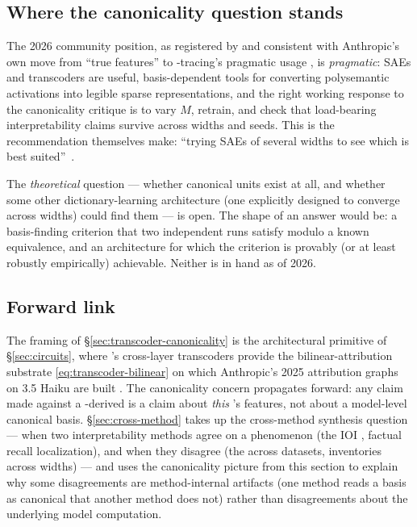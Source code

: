 \subsection{Where the canonicality question stands}
\label{sec:canonicality-frontier}

The 2026 community position, as registered by
\citet[\S 1]{leask2025-sae-not-canonical} and consistent with
Anthropic's own move from ``true features''
to -tracing's pragmatic  usage
, is
\emph{pragmatic}: SAEs and transcoders are useful, basis-dependent
tools for converting polysemantic activations into legible sparse
representations, and the right working response to the canonicality
critique is to vary $M$, retrain, and check that load-bearing
interpretability claims survive across widths and seeds. This is the
recommendation \citeauthor{leask2025-sae-not-canonical} themselves
make: ``trying SAEs of several widths to see which is best
suited''~\citep[\S 1]{leask2025-sae-not-canonical}.

The \emph{theoretical} question --- whether canonical units exist at
all, and whether some other dictionary-learning architecture (one
explicitly designed to converge across widths) could find them ---
is open. The shape of an answer would be: a basis-finding criterion
that two independent runs satisfy modulo a known equivalence, and an
architecture for which the criterion is provably (or at least
robustly empirically) achievable. Neither is in hand as of 2026.

\subsection{Forward link}
\label{sec:canonicality-forward}

The  framing of \S\ref{sec:transcoder-canonicality} is the
architectural primitive of \S\ref{sec:circuits}, where
\citet{lindsey2025-circuit-tracing}'s cross-layer transcoders provide
the bilinear-attribution substrate
\eqref{eq:transcoder-bilinear} on which Anthropic's 2025 attribution
graphs on  3.5 Haiku are built
. The
canonicality concern propagates forward: any  claim made
against a -derived  is a claim about
\emph{this} 's features, not about a model-level canonical
basis. \S\ref{sec:cross-method} takes up the cross-method synthesis
question --- when two interpretability methods agree on a phenomenon
(the IOI , factual recall localization), and when they
disagree (the  across datasets,   inventories
across widths) --- and uses the canonicality picture from this
section to explain why some disagreements are method-internal
artifacts (one method reads a basis as canonical that another method
does not) rather than disagreements about the underlying model
computation.
